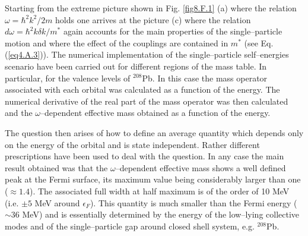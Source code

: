 \begin{subappendices}
Starting from the extreme picture shown in Fig. \ref{fig8.F.1} (a) where the relation $\omega=\hbar^2k^2/2m$ holds one arrives at the picture (c) where the relation $d\omega=\hbar^2k\delta k/m^*$ again accounts for the main properties of the single--particle motion and where the effect of the couplings are contained in $m^*$ (see Eq. (\ref{eq4.A.3})). The numerical implementation of the single--particle self--energies scenario have been carried out for different regions of the mass table. In particular, for the valence levels of $^{208}$Pb. In this case the mass operator associated with each orbital was calculated as a function of the energy. The numerical derivative of the real part of the mass operator was then calculated and the $\omega$--dependent effective mass obtained as a function of the energy.


The question then arises of how to define an average quantity which depends only on the energy of the orbital and is state independent. Rather different prescriptions have been used to deal with the question. In any case the main result obtained was that the $\omega$--dependent effective mass shows a well defined peak at the Fermi surface, its maximum value being considerably larger than one ($\approx 1.4$). The associated full width at half maximum is of the order of 10 MeV (i.e. $\pm 5$ MeV around $\epsilon_F$). This quantity is much smaller than the Fermi energy ($\sim 36$ MeV) and is essentially determined by the energy of the low--lying collective modes and of the single--particle gap around closed shell system, e.g. $^{208}$Pb.

\end{subappendices}









%
 
